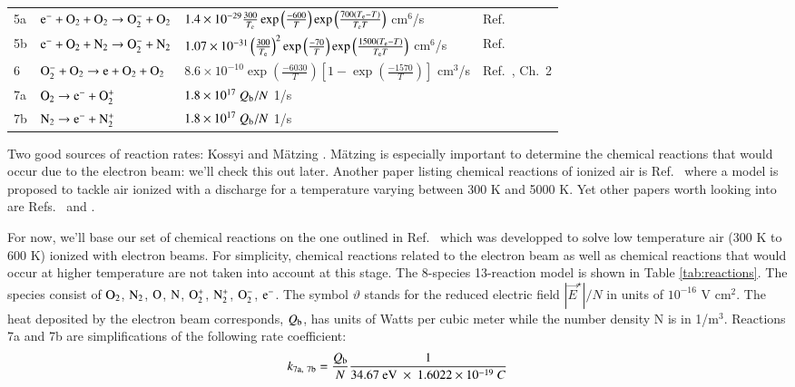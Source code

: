 \documentclass{warpdoc}
\let\citen\cite
\begin{document}
\begin{table}
\begin{threeparttable}
\begin{tabular}{llll}
    5a & $\rm e^- + O_2 +O_2 \rightarrow O_2^- + O_2$  
       & $1.4 \times 10^{-29} \frac{300}{T_{\rm e}} \exp \left( \frac{-600}{T}\right)
         \exp \left( \frac{700(T_{\rm e}-T)}{T_{\rm e} T}  \right)$ cm$^6$/s
       & Ref.\ \citen{misc:1992:kossyi}\\
    5b & $\rm e^- + O_2 + N_2 \rightarrow O_2^- + N_2$  
       & $1.07 \times 10^{-31} \left( \frac{300}{T_{\rm e}} \right)^2 \exp \left( \frac{-70}{T}\right)
         \exp \left( \frac{1500(T_{\rm e}-T)}{T_{\rm e} T}  \right)$ cm$^6$/s
       & Ref.\ \citen{misc:1992:kossyi}\\
    6  & $\rm O_2^- + O_2 \rightarrow e + O_2 + O_2$  
       & $8.6 \times 10^{-10} \exp \left( \frac{-6030}{T}\right)
               \left[1-\exp \left( \frac{-1570}{T} \right)  \right]$ cm$^3$/s
       & Ref.\ \citen{book:1997:bazelyan}, Ch.\ 2\\
    7a  & $\rm O_2 \rightarrow e^- + O_2^+$   
       & $1.8 \times 10^{17} ~Q_{\rm b}/N$ 1/s &\\
    7b  & $\rm N_2 \rightarrow e^- + N_2^+$   
       & $1.8 \times 10^{17} ~Q_{\rm b}/N$ 1/s &\\
    \bottomrule
    \end{tabular}
   \end{threeparttable}
\end{table}
%







Two good sources of reaction rates: Kossyi \cite{misc:1992:kossyi}
and M\"atzing \cite{misc:1991:matzing}. M\"atzing is especially important to determine the
chemical reactions that would occur due to the electron beam: we'll check this out later.
Another paper listing chemical reactions of ionized air is Ref.\ \citen{misc:1997:aleksandrov} where a model is proposed to tackle air ionized with a discharge for a temperature varying between 300 K and 5000 K. Yet other papers worth looking into are Refs.\ \citen{misc:2000:bourdon} and \citen{aiaaconf:1999:laux}.


For now, we'll base our set of chemical reactions on the one outlined in Ref.\ \citen{misc:2002:macheret} which was developped to solve low temperature air (300 K to 600 K) ionized with electron beams. For simplicity, chemical reactions related to the electron beam as well as chemical reactions that would occur at higher temperature are not taken into account at this stage. The 8-species 13-reaction model is shown in Table \ref{tab:reactions}.
The species consist of $\rm O_2$, $\rm N_2$, $\rm O$, $\rm N$, $\rm O_2^+$, $\rm N_2^+$,  $\rm O_2^-$, $\rm e^-$. The symbol $\vartheta$ stands for the reduced electric field $|\vec{E}^\star|/N$ in units of $10^{-16}$ V cm$^2$. The heat deposited by the electron beam  corresponds, $Q_{\rm b}$, has units of Watts per cubic meter while the number density N is in 1/m$^3$. Reactions 7a and 7b are simplifications of the following rate coefficient:
%
\begin{equation}
  k_{\rm 7a,~7b}=\frac{Q_{\rm b}}{N} \frac{1}{34.67 {\rm ~eV} ~\times~ 1.6022 \times 10^{-19}~C}
\end{equation}
%
\end{document}
